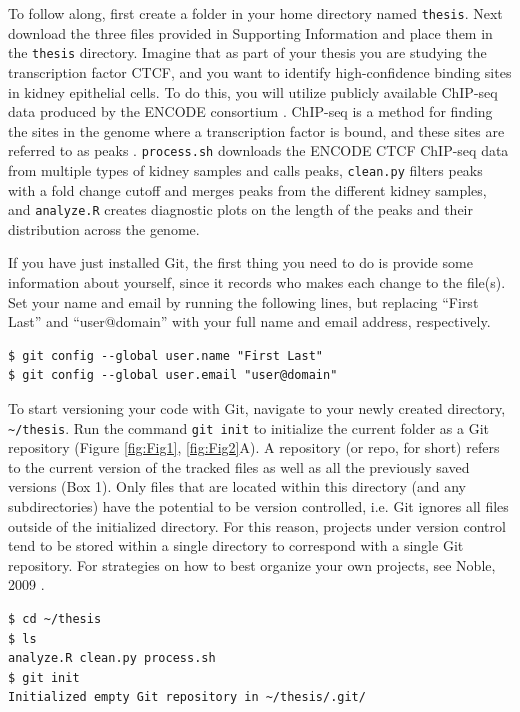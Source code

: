 \documentclass[10pt]{article}
\begin{document}
To follow along, first create a folder in your home directory named \verb|thesis|.
Next download the three files provided in Supporting Information and place them in the \verb|thesis| directory.
Imagine that as part of your thesis you are studying the transcription factor CTCF, and you want to identify high-confidence binding sites in kidney epithelial cells.
To do this, you will utilize publicly available ChIP-seq data produced by the ENCODE consortium \cite{22955616}.
ChIP-seq is a method for finding the sites in the genome where a transcription factor is bound, and these sites are referred to as peaks \cite{24244136}.
\verb|process.sh| downloads the ENCODE CTCF ChIP-seq data from multiple types of kidney samples and calls peaks,
\verb|clean.py| filters peaks with a fold change cutoff and merges peaks from the different kidney samples,
and \verb|analyze.R| creates diagnostic plots on the length of the peaks and their distribution across the genome.

If you have just installed Git, the first thing you need to do is provide some information about yourself, since it records who makes each change to the file(s).
Set your name and email by running the following lines, but replacing ``First Last'' and ``user@domain'' with your full name and email address, respectively.

\begin{verbatim}
$ git config --global user.name "First Last"
$ git config --global user.email "user@domain"
\end{verbatim}

To start versioning your code with Git, navigate to your newly created directory, \verb|~/thesis|.
Run the command \verb|git init| to initialize the current folder as a Git repository (Figure \ref{fig:Fig1}, \ref{fig:Fig2}A).
A repository (or repo, for short) refers to the current version of the tracked files as well as all the previously saved versions (Box 1).
Only files that are located within this directory (and any subdirectories) have the potential to be version controlled,
i.e. Git ignores all files outside of the initialized directory.
For this reason, projects under version control tend to be stored within a single directory to correspond with a single Git repository.
For strategies on how to best organize your own projects, see Noble, 2009 \cite{19649301}.

\begin{verbatim}
$ cd ~/thesis
$ ls
analyze.R clean.py process.sh
$ git init
Initialized empty Git repository in ~/thesis/.git/
\end{verbatim}
\end{document}
